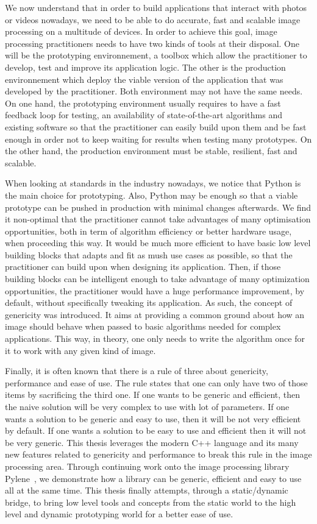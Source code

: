 We now understand that in order to build applications that interact with photos or videos nowadays, we need to be able
to do accurate, fast and scalable image processing on a multitude of devices. In order to achieve this goal, image
processing practitioners needs to have two kinds of tools at their disposal. One will be the prototyping environnement,
a toolbox which allow the practitioner to develop, test and improve its application logic. The other is the production
environnement which deploy the viable version of the application that was developed by the practitioner. Both
environment may not have the same needs. On one hand, the prototyping environment usually requires to have a fast
feedback loop for testing, an availability of state-of-the-art algorithms and existing software so that the practitioner
can easily build upon them and be fast enough in order not to keep waiting for results when testing many prototypes. On
the other hand, the production environment must be stable, resilient, fast and scalable.

When looking at standards in the industry nowadays, we notice that Python is the main choice for prototyping. Also,
Python may be enough so that a viable prototype can be pushed in production with minimal changes afterwards. We find it
non-optimal that the practitioner cannot take advantages of many optimisation opportunities, both in term of algorithm
efficiency or better hardware usage, when proceeding this way. It would be much more efficient to have basic low level
building blocks that adapts and fit as mush use cases as possible, so that the practitioner can build upon when
designing its application. Then, if those building blocks can be intelligent enough to take advantage of many
optimization opportunities, the practitioner would have a huge performance improvement, by default, without specifically
tweaking its application. As such, the concept of genericity was introduced. It aims at providing a common ground about
how an image should behave when passed to basic algorithms needed for complex applications. This way, in theory, one
only needs to write the algorithm once for it to work with any given kind of image.

Finally, it is often known that there is a rule of three about genericity, performance and ease of use. The rule states
that one can only have two of those items by sacrificing the third one. If one wants to be generic and efficient, then
the naive solution will be very complex to use with lot of parameters. If one wants a solution to be generic and easy to
use, then it will be not very efficient by default. If one wants a solution to be easy to use and efficient then it will
not be very generic. This thesis leverages the modern C++ language and its many new features related to genericity and
performance to break this rule in the image processing area. Through continuing work onto the image processing library
Pylene~\cite{carlinet.2018.pylena}, we demonstrate how a library can be generic, efficient and easy to use all at the
same time. This thesis finally attempts, through a static/dynamic bridge, to bring low level tools and concepts from the
static world to the high level and dynamic prototyping world for a better ease of use.

